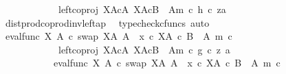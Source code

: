 \begin{isabellebody}
\ \ \ \ \ \ \ \ \ \ \ \ left{\isacharunderscore}{\kern0pt}coproj\ {\isacharparenleft}{\kern0pt}X\isactrlbsup A\isactrlesup {\isasymtimes}\isactrlsub cA{\isacharparenright}{\kern0pt}\ {\isacharparenleft}{\kern0pt}X\isactrlbsup A\isactrlesup {\isasymtimes}\isactrlsub c{\isacharparenleft}{\kern0pt}B\ {\isasymsetminus}\ {\isacharparenleft}{\kern0pt}A{\isacharcomma}{\kern0pt}m{\isacharparenright}{\kern0pt}{\isacharparenright}{\kern0pt}{\isacharparenright}{\kern0pt}\ {\isasymcirc}\isactrlsub c\ {\isasymlangle}h\ {\isasymcirc}\isactrlsub c\ z{\isacharcomma}{\kern0pt}a{\isasymrangle}{\isachardoublequoteclose}\isanewline
\ \ \ \ \ \ \ \ \ \ \ \ \isamarkupfalse%
\ dist{\isacharunderscore}{\kern0pt}prod{\isacharunderscore}{\kern0pt}coprod{\isacharunderscore}{\kern0pt}inv{\isacharunderscore}{\kern0pt}left{\isacharunderscore}{\kern0pt}ap\ \isamarkupfalse%
\ {\isacharparenleft}{\kern0pt}typecheck{\isacharunderscore}{\kern0pt}cfuncs{\isacharcomma}{\kern0pt}\ auto{\isacharparenright}{\kern0pt}\isanewline
\ \ \ \ \ \ \ \ \ \ \isamarkupfalse%
\ \isamarkupfalse%
\ {\isachardoublequoteopen}{\isacharparenleft}{\kern0pt}{\isacharparenleft}{\kern0pt}eval{\isacharunderscore}{\kern0pt}func\ X\ A\ {\isasymcirc}\isactrlsub c\ swap\ {\isacharparenleft}{\kern0pt}X\isactrlbsup A\isactrlesup {\isacharparenright}{\kern0pt}\ A{\isacharparenright}{\kern0pt}\ {\isasymamalg}\ {\isacharparenleft}{\kern0pt}x\ {\isasymcirc}\isactrlsub c\ {\isasymbeta}\isactrlbsub X\isactrlbsup A\isactrlesup \ {\isasymtimes}\isactrlsub c\ {\isacharparenleft}{\kern0pt}B\ {\isasymsetminus}\ {\isacharparenleft}{\kern0pt}A{\isacharcomma}{\kern0pt}\ m{\isacharparenright}{\kern0pt}{\isacharparenright}{\kern0pt}\isactrlesub {\isacharparenright}{\kern0pt}\ {\isasymcirc}\isactrlsub c\isanewline
\ \ \ \ \ \ \ \ \ \ \ \ left{\isacharunderscore}{\kern0pt}coproj\ {\isacharparenleft}{\kern0pt}X\isactrlbsup A\isactrlesup {\isasymtimes}\isactrlsub cA{\isacharparenright}{\kern0pt}\ {\isacharparenleft}{\kern0pt}X\isactrlbsup A\isactrlesup {\isasymtimes}\isactrlsub c{\isacharparenleft}{\kern0pt}B\ {\isasymsetminus}\ {\isacharparenleft}{\kern0pt}A{\isacharcomma}{\kern0pt}m{\isacharparenright}{\kern0pt}{\isacharparenright}{\kern0pt}{\isacharparenright}{\kern0pt}{\isacharparenright}{\kern0pt}\ {\isasymcirc}\isactrlsub c\ {\isasymlangle}g\ {\isasymcirc}\isactrlsub c\ z{\isacharcomma}{\kern0pt}\ a{\isasymrangle}\isanewline
\ \ \ \ \ \ \ \ \ \ {\isacharequal}{\kern0pt}\ {\isacharparenleft}{\kern0pt}{\isacharparenleft}{\kern0pt}eval{\isacharunderscore}{\kern0pt}func\ X\ A\ {\isasymcirc}\isactrlsub c\ swap\ {\isacharparenleft}{\kern0pt}X\isactrlbsup A\isactrlesup {\isacharparenright}{\kern0pt}\ A{\isacharparenright}{\kern0pt}\ {\isasymamalg}\ {\isacharparenleft}{\kern0pt}x\ {\isasymcirc}\isactrlsub c\ {\isasymbeta}\isactrlbsub X\isactrlbsup A\isactrlesup \ {\isasymtimes}\isactrlsub c\ {\isacharparenleft}{\kern0pt}B\ {\isasymsetminus}\ {\isacharparenleft}{\kern0pt}A{\isacharcomma}{\kern0pt}\ m{\isacharparenright}{\kern0pt}{\isacharparenright}{\kern0pt}\isactrlesub {\isacharparenright}{\kern0pt}\ {\isasymcirc}\isactrlsub c\isanewline

\end{isabellebody}
